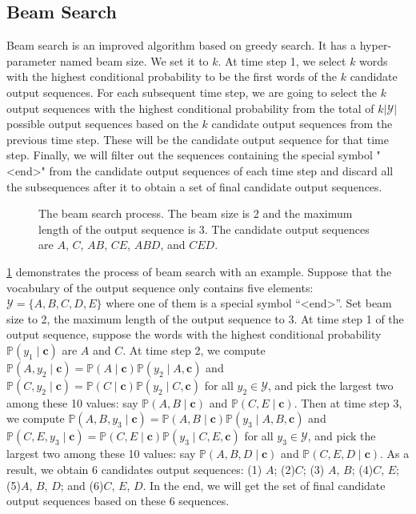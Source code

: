\subsection{Beam Search}\label{subsec:beam-search}

Beam search is an improved algorithm based on greedy search. It has a hyper-parameter named beam size. We set it to $k$. At time step 1, we select $k$ words with the highest conditional probability to be the first words of the $k$ candidate output sequences. For each subsequent time step, we are going to select the $k$ output sequences with the highest conditional probability from the total of $k\left|\mathcal{Y}\right|$ possible output sequences based on the $k$ candidate output sequences from the previous time step. These will be the candidate output sequence for that time step. Finally, we will filter out the sequences containing the special symbol "<end>" from the candidate output sequences of each time step and discard all the subsequences after it to obtain a set of final candidate output sequences.

\begin{figure}[hpt]
	\centering
	
	\caption{The beam search process. The beam size is 2 and the maximum length of the output sequence is 3. The candidate output sequences are $A$, $C$, $AB$, $CE$, $ABD$, and $CED$. }
	\label{fig:beam_search}
\end{figure}

\cref{fig:beam_search} demonstrates the process of beam search with an example. Suppose that the vocabulary of the output sequence only contains five elements: $\mathcal{Y} = \{A, B, C, D, E\}$ where one of them is a special symbol “<end>”. Set beam size to 2, the maximum length of the output sequence to 3. At time step 1 of the output sequence, suppose the words with the highest conditional probability $\mathbb{P}(y_1 \mid \boldsymbol{c})$ are $A$ and $C$. At time step 2, we compute $\mathbb{P}(A, y_2 \mid \boldsymbol{c}) = \mathbb{P}(A \mid \boldsymbol{c})\mathbb{P}(y_2 \mid A, \boldsymbol{c})$ and $\mathbb{P}(C, y_2 \mid \boldsymbol{c}) = \mathbb{P}(C \mid \boldsymbol{c})\mathbb{P}(y_2 \mid C, \boldsymbol{c})$ for all $y_2 \in \mathcal{Y}$, and pick the largest two among these 10 values: say $\mathbb{P}(A, B \mid \boldsymbol{c})$ and $\mathbb{P}(C, E \mid \boldsymbol{c})$. Then at time step 3, we compute $\mathbb{P}(A, B, y_3 \mid \boldsymbol{c}) = \mathbb{P}(A, B \mid \boldsymbol{c})\mathbb{P}(y_3 \mid A, B, \boldsymbol{c})$ and $\mathbb{P}(C, E, y_3 \mid \boldsymbol{c}) = \mathbb{P}(C, E \mid \boldsymbol{c})\mathbb{P}(y_3 \mid C, E, \boldsymbol{c})$ for all $y_3 \in \mathcal{Y}$, and pick the largest two among these 10 values: say $\mathbb{P}(A, B, D \mid \boldsymbol{c})$ and $\mathbb{P}(C, E, D \mid  \boldsymbol{c})$. As a result, we obtain 6 candidates output sequences: (1) $A$; (2)$C$; (3) $A$, $B$; (4)$C$, $E$; (5)$A$, $B$, $D$; and (6)$C$, $E$, $D$. In the end, we will get the set of final candidate output sequences based on these 6 sequences.

